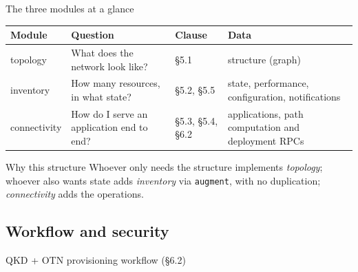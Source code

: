 \documentclass[10pt]{beamer}
\begin{document}
\begin{frame}{The three modules at a glance}
  \small
  \begin{tabularx}{\textwidth}{@{}l L l L@{}}
    \toprule
    \textbf{Module} & \textbf{Question} & \textbf{Clause} & \textbf{Data} \\
    \midrule
    topology & What does the network look like? & §5.1 & structure (graph) \\
    inventory & How many resources, in what state? & §5.2, §5.5 &
    state, performance, configuration, notifications \\
    connectivity & How do I serve an application end to end? & §5.3, §5.4, §6.2 &
    applications, path computation and deployment RPCs \\
    \bottomrule
  \end{tabularx}
  \vspace{3ex}
  \begin{exampleblock}{Why this structure}
    Whoever only needs the structure implements \emph{topology}; whoever
    also wants state adds \emph{inventory} via \texttt{augment}, with no
    duplication; \emph{connectivity} adds the operations.
  \end{exampleblock}
\end{frame}

\subsection{Workflow and security}

\begin{frame}{QKD + OTN provisioning workflow (§6.2)}
\end{frame}
\end{document}
